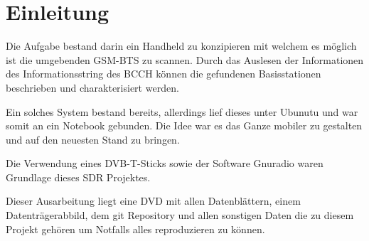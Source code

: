 %
%
\chapter{Einleitung}
Die Aufgabe bestand darin ein Handheld zu konzipieren mit welchem es möglich ist die umgebenden GSM-\ac{BTS} zu scannen. Durch das Auslesen der Informationen des Informationsstring des \ac{BCCH} können die gefundenen Basisstationen beschrieben und charakterisiert werden.

Ein solches System bestand bereits, allerdings lief dieses unter Ubunutu und war somit an ein Notebook gebunden. Die Idee war es das Ganze mobiler zu gestalten und auf den neuesten Stand zu bringen. 

Die Verwendung eines DVB-T-Sticks sowie der Software Gnuradio waren Grundlage dieses \ac{SDR} Projektes.

Dieser Ausarbeitung liegt eine DVD mit allen Datenblättern, einem Datenträgerabbild, dem git Repository und allen sonstigen Daten die zu diesem Projekt gehören um Notfalls alles reproduzieren zu können. 

